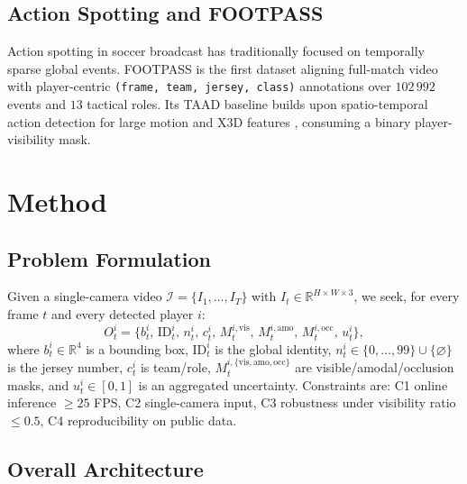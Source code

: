 \documentclass[conference]{IEEEtran}
\begin{document}
\subsection{Action Spotting and FOOTPASS}
Action spotting in soccer broadcast has traditionally focused on temporally sparse global events. FOOTPASS \cite{footpass} is the first dataset aligning full-match video with player-centric \texttt{(frame, team, jersey, class)} annotations over $102\,992$ events and $13$ tactical roles. Its TAAD baseline builds upon spatio-temporal action detection for large motion \cite{stadlargemotion} and X3D features \cite{x3d}, consuming a binary player-visibility mask.

\section{Method}
\label{sec:method}

\subsection{Problem Formulation}
\label{sec:problem}

Given a single-camera video $\mathcal{I}=\{I_1,\dots,I_T\}$ with $I_t\in\mathbb{R}^{H\times W\times 3}$, we seek, for every frame $t$ and every detected player $i$:
\begin{equation}
O_t^i = \{b_t^i,\, \text{ID}_t^i,\, n_t^i,\, c_t^i,\, M_t^{i,\text{vis}},\, M_t^{i,\text{amo}},\, M_t^{i,\text{occ}},\, u_t^i\},
\end{equation}
where $b_t^i\in\mathbb{R}^4$ is a bounding box, $\text{ID}_t^i$ is the global identity, $n_t^i\in\{0,\dots,99\}\cup\{\varnothing\}$ is the jersey number, $c_t^i$ is team/role, $M_t^{i,\{\text{vis},\text{amo},\text{occ}\}}$ are visible/amodal/occlusion masks, and $u_t^i\in[0,1]$ is an aggregated uncertainty. Constraints are: C1 online inference $\geq 25$ FPS, C2 single-camera input, C3 robustness under visibility ratio $\leq 0.5$, C4 reproducibility on public data.

\subsection{Overall Architecture}
\label{sec:arch}
\end{document}
